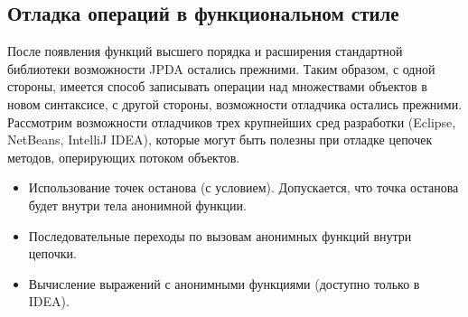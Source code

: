 \subsection{Отладка операций в функциональном стиле}
После появления функций высшего порядка и расширения стандартной библиотеки возможности JPDA остались прежними. Таким образом, с одной стороны, имеется способ записывать операции над множествами объектов в новом синтаксисе, с другой стороны, возможности отладчика остались прежними. Рассмотрим возможности отладчиков трех крупнейших сред разработки (Eclipse, NetBeans, IntelliJ IDEA), которые могут быть полезны при отладке цепочек методов, оперирующих потоком объектов.

\begin{itemize}
	\item Использование точек останова (с условием). Допускается, что точка останова будет внутри тела анонимной функции.
	\item Последовательные переходы по вызовам анонимных функций внутри цепочки.
	\item Вычисление выражений с анонимными функциями (доступно только в IDEA).
\end{itemize}


